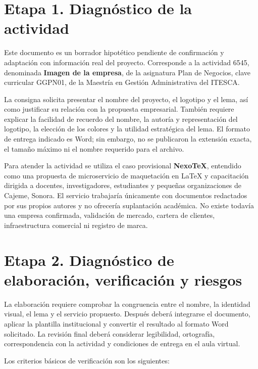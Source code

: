 \documentclass[12pt,letterpaper,oneside]{article}
\begin{document}
\section{Etapa 1. Diagnóstico de la actividad}

Este documento es un borrador hipotético pendiente de confirmación y adaptación con información real del proyecto. Corresponde a la actividad 6545, denominada \textbf{Imagen de la empresa}, de la asignatura Plan de Negocios, clave curricular GGPN01, de la Maestría en Gestión Administrativa del ITESCA.

La consigna solicita presentar el nombre del proyecto, el logotipo y el lema, así como justificar su relación con la propuesta empresarial. También requiere explicar la facilidad de recuerdo del nombre, la autoría y representación del logotipo, la elección de los colores y la utilidad estratégica del lema. El formato de entrega indicado es Word; sin embargo, no se publicaron la extensión exacta, el tamaño máximo ni el nombre requerido para el archivo.

Para atender la actividad se utiliza el caso provisional \textbf{NexoTeX}, entendido como una propuesta de microservicio de maquetación en LaTeX y capacitación dirigida a docentes, investigadores, estudiantes y pequeñas organizaciones de Cajeme, Sonora. El servicio trabajaría únicamente con documentos redactados por sus propios autores y no ofrecería suplantación académica. No existe todavía una empresa confirmada, validación de mercado, cartera de clientes, infraestructura comercial ni registro de marca.

\section{Etapa 2. Diagnóstico de elaboración, verificación y riesgos}

La elaboración requiere comprobar la congruencia entre el nombre, la identidad visual, el lema y el servicio propuesto. Después deberá integrarse el documento, aplicar la plantilla institucional y convertir el resultado al formato Word solicitado. La revisión final deberá considerar legibilidad, ortografía, correspondencia con la actividad y condiciones de entrega en el aula virtual.

Los criterios básicos de verificación son los siguientes:
\end{document}
